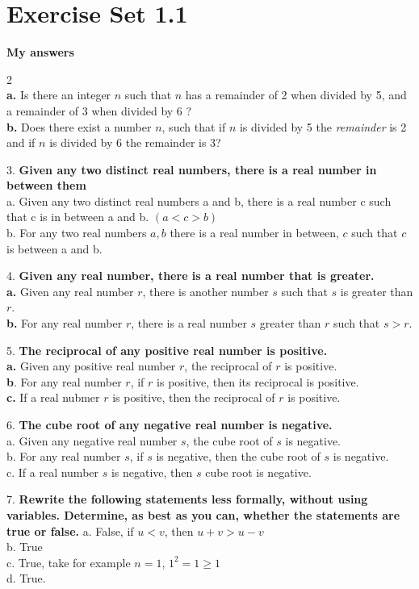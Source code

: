 \documentclass{article}
\begin{document}
\section{Exercise Set 1.1}

\textbf{My answers}
\newline

2\\
	\textbf{a.} Is there an integer $n$ such that $n$ has a remainder of 2 when divided by 5, and a remainder of 3 when divided by 6 ?\\
	\textbf{b.} Does there exist a number $n$, such that if $n$  is divided by 5 the \emph{remainder} is 2 and if $n$ is divided by 6 the remainder is 3?
\newline

3. \textbf{Given any two distinct real numbers, there is a real number in between them}\\
	a. Given any two distinct real numbers a and b, there is a real number c such that c is in between a and b. $(a < c > b)$\\
	b. For any two real numbers $a, b$  there is a real number in between, $c$ such that $c$ is between a and b.
\newline

4.\textbf{ Given any real number, there is a real number that
is greater.}\\
	\textbf{a.} Given any real number $r$, there is another number $s$ such that $s$ is greater than $r$.\\
	\textbf{b.} For any real number $r$, there is a real number $s$ greater than $r$ such that $s>r$.
\newline

5.  \textbf{The reciprocal of any positive real number is positive.}\\
	\textbf{a.} Given any positive real number $r$, the reciprocal of $r$ is positive.\\
	\textbf{b}. For any real number $r$, if $r$ is positive, then its reciprocal is positive.\\
	\textbf{c.} If a real nubmer $r$ is positive, then the reciprocal of $r$ is positive.
\newline

6. \textbf{The cube root of any negative real number is negative.}\\
	a. Given any negative real number $s$, the cube root of $s$ is negative.\\
	b. For any real number $s$, if $s$ is negative, then the cube root of $s$ is negative.\\
	c. If a real number $s$ is negative, then $s$ cube root is negative.
\newline

7.\textbf{ Rewrite the following statements less formally, without using variables. Determine, as best as you can, whether the statements are true or false.}
	a. False, if $u < v$, then $u + v > u - v$\\
	b. True\\
	c. True, take for example $n = 1$, $1^2 = 1 \geq 1$\\
	d. True.
\newline
\end{document}
